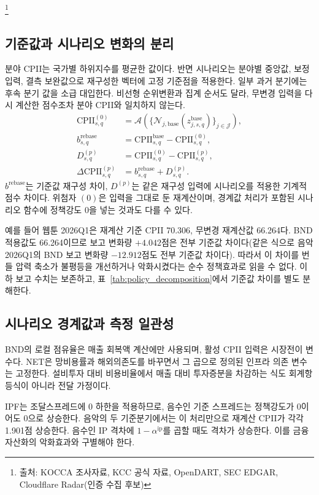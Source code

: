\documentclass[11pt,a4paper]{report}
\newcommand{\sourcefootnote}[1]{\footnote{출처: #1}}
\begin{document}
\sourcefootnote{KOCCA 조사자료, KCC 공식 자료, OpenDART, SEC EDGAR, Cloudflare Radar(인증 수집 후보)}

\subsection{기준값과 시나리오 변화의 분리}
분야 CPII는 국가별 하위지수를 평균한 값이다. 반면 시나리오는 분야별 중앙값, 보정 입력, 결측 보완값으로 재구성한 벡터에 고정 기준점을 적용한다. 일부 과거 분기에는 후속 분기 값을 소급 대입한다. 비선형 순위변환과 집계 순서도 달라, 무변경 입력을 다시 계산한 점수조차 분야 CPII와 일치하지 않는다.
\[
\begin{aligned}
\mathrm{CPII}^{(0)}_{s,q}
&=\mathcal A\!\left(\{\mathcal N_{j,\mathrm{base}}
(z^{\mathrm{base}}_{j,s,q})\}_{j\in\mathcal J}\right),\\
b^{\mathrm{rebase}}_{s,q}
&=\mathrm{CPII}^{\mathrm{base}}_{s,q}-\mathrm{CPII}^{(0)}_{s,q},\\
D^{(p)}_{s,q}
&=\mathrm{CPII}^{(0)}_{s,q}-\mathrm{CPII}^{(p)}_{s,q},\\
\Delta\mathrm{CPII}^{(p)}_{s,q}
&=b^{\mathrm{rebase}}_{s,q}+D^{(p)}_{s,q}.
\end{aligned}
\]
\(b^{\mathrm{rebase}}\)는 기준값 재구성 차이, \(D^{(p)}\)는 같은 재구성 입력에 시나리오를 적용한 기계적 점수 차이다. 위첨자 \((0)\)은 입력을 그대로 둔 재계산이며, 경계값 처리가 포함된 시나리오 함수에 정책강도 0을 넣는 것과도 다를 수 있다.

예를 들어 웹툰 2026Q1은 재계산 기준 CPII 70.306, 무변경 재계산값 66.264다. BND 적용값도 66.264이므로 보고 변화량 $+4.042$점은 전부 기준값 차이다(같은 식으로 음악 2026Q1의 BND 보고 변화량 $-12.912$점도 전부 기준값 차이다). 따라서 이 차이를 번들 압력 축소가 불평등을 개선하거나 악화시켰다는 순수 정책효과로 읽을 수 없다. 이하 보고 수치는 보존하고, 표~\ref{tab:policy_decomposition}에서 기준값 차이를 별도 분해한다.

\subsection{시나리오 경계값과 측정 일관성}
BND의 로컬 점유율은 매출 회복액 계산에만 사용되며, 활성 CPII 입력은 시장전이 변수다. NET은 망비용률과 해외의존도를 바꾸면서 그 곱으로 정의된 인프라 의존 변수는 고정한다. 설비투자 대비 비용비율에서 매출 대비 투자증분을 차감하는 식도 회계항등식이 아니라 전달 가정이다.

IPF는 조달스프레드에 0 하한을 적용하므로, 음수인 기준 스프레드는 정책강도가 0이어도 0으로 상승한다. 음악의 두 기준분기에서는 이 처리만으로 재계산 CPII가 각각 1.901점 상승한다. 음수인 IP 격차에 \(1-\alpha^{\mathrm{ip}}\)를 곱할 때도 격차가 상승한다. 이를 금융 자산화의 악화효과와 구별해야 한다.
\end{document}
